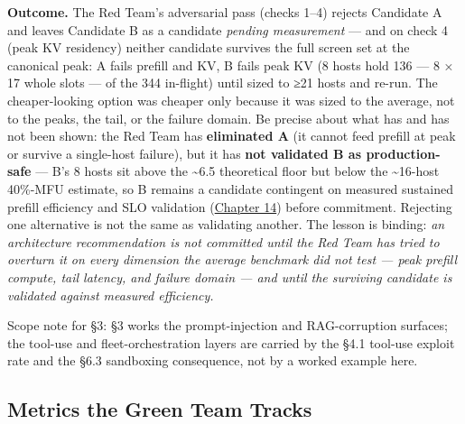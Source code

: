 \textbf{Outcome.} The Red Team's adversarial pass (checks 1--4) rejects
Candidate A and leaves Candidate B as a candidate \emph{pending
measurement} --- and on check 4 (peak KV residency) neither candidate
survives the full screen set at the canonical peak: A fails prefill and
KV, B fails peak KV (8 hosts hold 136 --- 8 × 17 whole slots --- of the
344 in-flight) until sized to ≥21 hosts and re-run. The cheaper-looking
option was cheaper only because it was sized to the average, not to the
peaks, the tail, or the failure domain. Be precise about what has and
has not been shown: the Red Team has \textbf{eliminated A} (it cannot
feed prefill at peak or survive a single-host failure), but it has
\textbf{not validated B as production-safe} --- B's 8 hosts sit above
the \textasciitilde6.5 theoretical floor but below the
\textasciitilde16-host 40\%-MFU estimate, so B remains a candidate
contingent on measured sustained prefill efficiency and SLO validation
(\hyperref[chap:14]{Chapter 14}) before commitment. Rejecting one alternative is not the
same as validating another. The lesson is binding: \emph{an architecture
recommendation is not committed until the Red Team has tried to overturn
it on every dimension the average benchmark did not test --- peak
prefill compute, tail latency, and failure domain --- and until the
surviving candidate is validated against measured efficiency.}

Scope note for §3: §3 works the prompt-injection and RAG-corruption
surfaces; the tool-use and fleet-orchestration layers are carried by the
§4.1 tool-use exploit rate and the §6.3 sandboxing consequence, not by a
worked example here.

\label{measurement}


\subsection{Metrics the Green Team
Tracks}\label{metrics-the-green-team-tracks}

